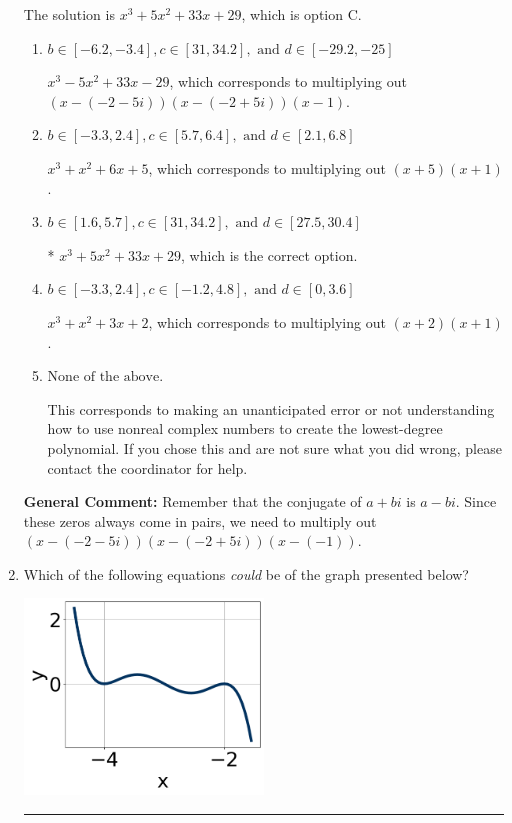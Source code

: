 \documentclass{extbook}[14pt]
\newcommand{\litem}[1]{\item #1

\rule{\textwidth}{0.4pt}}
\begin{document}
\begin{enumerate}
{The solution is \( x^{3} +5 x^{2} +33 x + 29 \), which is option C.\begin{enumerate}[label=\Alph*.]
\item \( b \in [-6.2, -3.4], c \in [31, 34.2], \text{ and } d \in [-29.2, -25] \)

$x^{3} -5 x^{2} +33 x -29$, which corresponds to multiplying out $(x-(-2 - 5 i))(x-(-2 + 5 i))(x -1)$.
\item \( b \in [-3.3, 2.4], c \in [5.7, 6.4], \text{ and } d \in [2.1, 6.8] \)

$x^{3} + x^{2} +6 x + 5$, which corresponds to multiplying out $(x + 5)(x + 1)$.
\item \( b \in [1.6, 5.7], c \in [31, 34.2], \text{ and } d \in [27.5, 30.4] \)

* $x^{3} +5 x^{2} +33 x + 29$, which is the correct option.
\item \( b \in [-3.3, 2.4], c \in [-1.2, 4.8], \text{ and } d \in [0, 3.6] \)

$x^{3} + x^{2} +3 x + 2$, which corresponds to multiplying out $(x + 2)(x + 1)$.
\item \( \text{None of the above.} \)

This corresponds to making an unanticipated error or not understanding how to use nonreal complex numbers to create the lowest-degree polynomial. If you chose this and are not sure what you did wrong, please contact the coordinator for help.
\end{enumerate}

\textbf{General Comment:} Remember that the conjugate of $a+bi$ is $a-bi$. Since these zeros always come in pairs, we need to multiply out $(x-(-2 - 5 i))(x-(-2 + 5 i))(x-(-1))$.
}
\litem{
Which of the following equations \textit{could} be of the graph presented below?

\begin{center}
    \includegraphics[width=0.5\textwidth]{../Figures/polyGraphToFunctionCopyA.png}
\end{center}




}
\end{enumerate}
\end{document}
